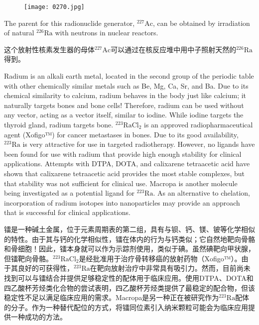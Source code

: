 \documentclass[dvipsnames, svgnames,a4paper,11pt]{article}
\begin{document}
\begin{figure}[h]
	\centering
    \texttt{[image: 0270.jpg]}  
     \label{fig364}
\end{figure}

The parent for this radionuclide generator, \(\mathrm{^{227}Ac}\), can be obtained by irradiation of natural \(\mathrm{^{226}Ra}\) with neutrons in nuclear reactors.

这个放射性核素发生器的母体\(\mathrm{^{227}Ac}\)可以通过在核反应堆中用中子照射天然的\(\mathrm{^{226}Ra}\)得到。

Radium is an alkali earth metal, located in the second group of the periodic table with other chemically similar metals such as Be, Mg, Ca, Sr, and Ba. Due to its chemical similarity to calcium, radium behaves in the body just like calcium; it naturally targets bones and bone cells! Therefore, radium can be used without any vector, acting as a vector itself, similar to iodine. While iodine targets the thyroid gland, radium targets bone. \(\mathrm{^{223}RaCl_2}\) is an approved radiopharmaceutical agent (Xofigo™) for cancer metastases in bones. Due to its good availability, \(\mathrm{^{223}Ra}\) is very attractive for use in targeted radiotherapy. However, no ligands have been found for use with radium that provide high enough stability for clinical applications. Attempts with DTPA, DOTA, and calixarene tetraacetic acid have shown that calixarene tetraacetic acid provides the most stable complexes, but that stability was not sufficient for clinical use. Macropa is another molecule being investigated as a potential ligand for \(\mathrm{^{223}Ra}\). As an alternative to chelation, incorporation of radium isotopes into nanoparticles may provide an approach that is successful for clinical applications.

镭是一种碱土金属，位于元素周期表的第二组，具有与钡、钙、镁、铍等化学相似的特性。由于其与钙的化学相似性，镭在体内的行为与钙类似；它自然地靶向骨骼和骨细胞！因此，镭本身就可以作为示踪剂使用，类似于碘。虽然碘靶向甲状腺，但镭靶向骨骼。\(\mathrm{^{223}RaCl_2}\)是经批准用于治疗骨转移癌的放射药物（Xofigo™）。由于其良好的可获得性，\(\mathrm{^{223}Ra}\)在靶向放射治疗中非常具有吸引力。然而，目前尚未找到可以与镭结合并提供足够稳定性的配体用于临床应用。使用DTPA、DOTA和四乙酸杯芳烃类化合物的尝试表明，四乙酸杯芳烃类提供了最稳定的配合物，但该稳定性不足以满足临床应用的需求。Macropa是另一种正在被研究作为\(\mathrm{^{223}Ra}\)配体的分子。作为一种替代配位的方式，将镭同位素引入纳米颗粒可能会为临床应用提供一种成功的方法。
\end{document}
